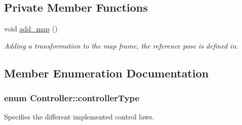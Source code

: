 \subsection*{Private Member Functions}
\begin{DoxyCompactItemize}
\item 
void \hyperlink{classController_ac3c2cc7b8afdf05ade60e03eaca88b91}{add\+\_\+map} ()\hypertarget{classController_ac3c2cc7b8afdf05ade60e03eaca88b91}{}\label{classController_ac3c2cc7b8afdf05ade60e03eaca88b91}

\begin{DoxyCompactList}\small\item\em Adding a transformation to the map frame, the reference pose is defined in. \end{DoxyCompactList}\end{DoxyCompactItemize}


\subsection{Member Enumeration Documentation}
\subsubsection[{\texorpdfstring{controller\+Type}{controllerType}}]{\setlength{\rightskip}{0pt plus 5cm}enum {\bf Controller\+::controller\+Type}}\hypertarget{classController_a86221d052db839985bd6e4d73013cd06}{}\label{classController_a86221d052db839985bd6e4d73013cd06}


Specifies the different implemented control laws. 

